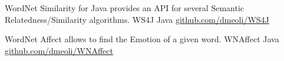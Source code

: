 \begin{cventries}
  \cventry
    {WordNet Similarity for Java provides an API for several Semantic Relatedness/Similarity algorithms.} %
    {WS4J} %
    {Java} %
    {\href{https://github.com/dmeoli/WS4J}{github.com/dmeoli/WS4J}} %
    {}

  \cventry
    {WordNet Affect allows to find the Emotion of a given word.} %
    {WNAffect} %
    {Java} %
    {\href{https://github.com/dmeoli/WNAffect}{github.com/dmeoli/WNAffect}} %
    {}

\end{cventries}
